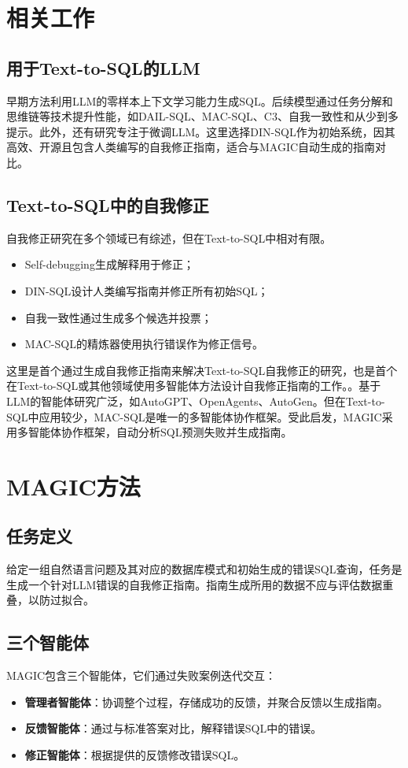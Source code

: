 \section{相关工作}

\subsection{用于Text-to-SQL的LLM}
早期方法利用LLM的零样本上下文学习能力生成SQL。后续模型通过任务分解和思维链等技术提升性能，如DAIL-SQL、MAC-SQL、C3、自我一致性和从少到多提示。此外，还有研究专注于微调LLM。这里选择DIN-SQL作为初始系统，因其高效、开源且包含人类编写的自我修正指南，适合与MAGIC自动生成的指南对比。

\subsection{Text-to-SQL中的自我修正}
自我修正研究在多个领域已有综述，但在Text-to-SQL中相对有限。
\begin{itemize}
\item Self-debugging生成解释用于修正；
\item DIN-SQL设计人类编写指南并修正所有初始SQL；
\item 自我一致性通过生成多个候选并投票；
\item MAC-SQL的精炼器使用执行错误作为修正信号。
\end{itemize}
这里是首个通过生成自我修正指南来解决Text-to-SQL自我修正的研究，也是首个在Text-to-SQL或其他领域使用多智能体方法设计自我修正指南的工作。。基于LLM的智能体研究广泛，如AutoGPT、OpenAgents、AutoGen。但在Text-to-SQL中应用较少，MAC-SQL是唯一的多智能体协作框架。受此启发，MAGIC采用多智能体协作框架，自动分析SQL预测失败并生成指南。

\section{MAGIC方法}

\subsection{任务定义}
给定一组自然语言问题及其对应的数据库模式和初始生成的错误SQL查询，任务是生成一个针对LLM错误的自我修正指南。指南生成所用的数据不应与评估数据重叠，以防过拟合。

\subsection{三个智能体}
MAGIC包含三个智能体，它们通过失败案例迭代交互：
\begin{itemize}
    \item \textbf{管理者智能体}：协调整个过程，存储成功的反馈，并聚合反馈以生成指南。
    \item \textbf{反馈智能体}：通过与标准答案对比，解释错误SQL中的错误。
    \item \textbf{修正智能体}：根据提供的反馈修改错误SQL。
\end{itemize}

